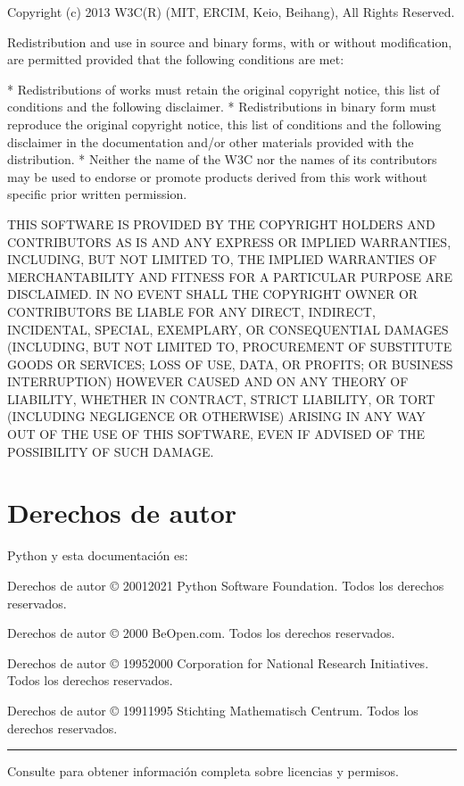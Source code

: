 \documentclass[a4,10pt,spanish]{sphinxmanual}
\begin{document}
\begin{sphinxVerbatim}[commandchars=\\\{\}]
Copyright (c) 2013 W3C(R) (MIT, ERCIM, Keio, Beihang),
All Rights Reserved.

Redistribution and use in source and binary forms, with or without
modification, are permitted provided that the following conditions
are met:

* Redistributions of works must retain the original copyright notice,
  this list of conditions and the following disclaimer.
* Redistributions in binary form must reproduce the original copyright
  notice, this list of conditions and the following disclaimer in the
  documentation and/or other materials provided with the distribution.
* Neither the name of the W3C nor the names of its contributors may be
  used to endorse or promote products derived from this work without
  specific prior written permission.

THIS SOFTWARE IS PROVIDED BY THE COPYRIGHT HOLDERS AND CONTRIBUTORS
\PYGZdq{}AS IS\PYGZdq{} AND ANY EXPRESS OR IMPLIED WARRANTIES, INCLUDING, BUT NOT
LIMITED TO, THE IMPLIED WARRANTIES OF MERCHANTABILITY AND FITNESS FOR
A PARTICULAR PURPOSE ARE DISCLAIMED. IN NO EVENT SHALL THE COPYRIGHT
OWNER OR CONTRIBUTORS BE LIABLE FOR ANY DIRECT, INDIRECT, INCIDENTAL,
SPECIAL, EXEMPLARY, OR CONSEQUENTIAL DAMAGES (INCLUDING, BUT NOT
LIMITED TO, PROCUREMENT OF SUBSTITUTE GOODS OR SERVICES; LOSS OF USE,
DATA, OR PROFITS; OR BUSINESS INTERRUPTION) HOWEVER CAUSED AND ON ANY
THEORY OF LIABILITY, WHETHER IN CONTRACT, STRICT LIABILITY, OR TORT
(INCLUDING NEGLIGENCE OR OTHERWISE) ARISING IN ANY WAY OUT OF THE USE
OF THIS SOFTWARE, EVEN IF ADVISED OF THE POSSIBILITY OF SUCH DAMAGE.
\end{sphinxVerbatim}
\label{\detokenize{copyright::doc}}

\chapter{Derechos de autor}
\label{\detokenize{copyright:copyright}}
\sphinxAtStartPar
Python y esta documentación es:

\sphinxAtStartPar
Derechos de autor © 2001\sphinxhyphen{}2021 Python Software Foundation. Todos los derechos reservados.

\sphinxAtStartPar
Derechos de autor © 2000 BeOpen.com. Todos los derechos reservados.

\sphinxAtStartPar
Derechos de autor © 1995\sphinxhyphen{}2000 Corporation for National Research Initiatives. Todos los derechos reservados.

\sphinxAtStartPar
Derechos de autor © 1991\sphinxhyphen{}1995 Stichting Mathematisch Centrum.  Todos los derechos reservados.


\bigskip\hrule\bigskip


\sphinxAtStartPar
Consulte {\hyperref[\detokenize{license:history-and-license}]{}} para obtener información completa sobre licencias y permisos.



\renewcommand{\indexname}{Índice}
\printindex
\end{document}
